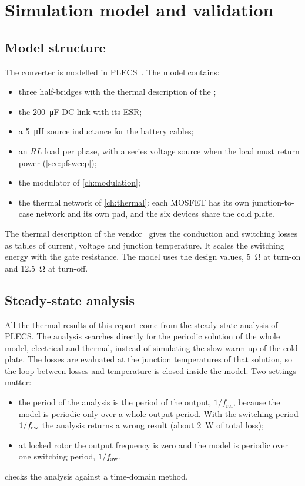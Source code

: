 \chapter{Simulation model and validation}
\label{ch:model}

\section{Model structure}

The converter is modelled in PLECS~\cite{plecs}. The model contains:
\begin{itemize}
  \item three half-bridges with the thermal description of the \device{};
  \item the \SI{200}{\micro\farad} DC-link with its ESR;
  \item a \SI{5}{\micro\henry} source inductance for the battery cables;
  \item an $RL$ load per phase, with a series voltage source when the load
        must return power (\cref{sec:pfsweep});
  \item the modulator of \cref{ch:modulation};
  \item the thermal network of \cref{ch:thermal}: each MOSFET has its own
        junction-to-case network and its own pad, and the six devices share
        the cold plate.
\end{itemize}
The thermal description of the vendor~\cite{wolfspeed_plecs} gives the
conduction and switching losses as tables of current, voltage and junction
temperature. It scales the switching energy with the gate resistance. The
model uses the design values, \SI{5}{\ohm} at turn-on and \SI{12.5}{\ohm} at
turn-off.

\section{Steady-state analysis}
\label{sec:ssanalysis}

All the thermal results of this report come from the steady-state analysis
of PLECS. The analysis searches directly for the periodic solution of the
whole model, electrical and thermal, instead of simulating the slow warm-up
of the cold plate. The losses are evaluated at the junction temperatures of
that solution, so the loop between losses and temperature is closed inside
the model. Two settings matter:
\begin{itemize}
  \item the period of the analysis is the period of the output,
        $1/f_\mathrm{ref}$, because the model is periodic only over a whole
        output period. With the switching period $1/f_{\mathrm{sw}}$ the analysis
        returns a wrong result (about \SI{2}{\watt} of total loss);
  \item at locked rotor the output frequency is zero and the model is
        periodic over one switching period, $1/f_{\mathrm{sw}}$.
\end{itemize}
 checks the analysis against a time-domain method.

